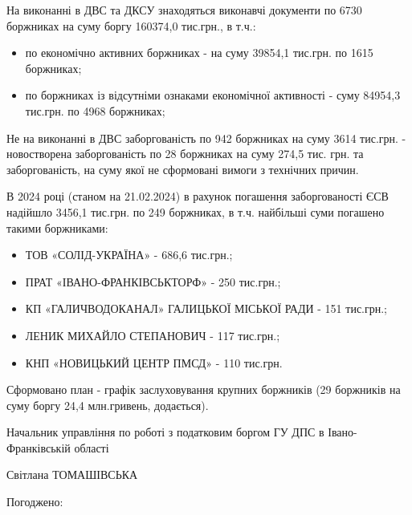  На виконанні в ДВС та ДКСУ знаходяться виконавчі документи по 6730 боржниках на суму боргу 160374,0 тис.грн., в т.ч.:
 \begin{itemize}
     \item по економічно активних боржниках - на суму 39854,1 тис.грн. по 1615 боржниках;
     \item по боржниках із відсутніми ознаками економічної активності - суму 84954,3 тис.грн. по 4968 боржниках;
 \end{itemize}

 Не на виконанні в ДВС заборгованість по 942 боржниках на суму 3614 тис.грн. - новостворена заборгованість по 28 боржниках на суму 274,5 тис. грн. та заборгованість, на суму якої не сформовані вимоги з технічних причин.

 В 2024 році (станом на 21.02.2024) в рахунок погашення заборгованості ЄСВ надійшло 3456,1 тис.грн. по 249 боржниках, в т.ч. найбільші суми погашено такими боржниками:
 \begin{itemize}
     \item ТОВ «СОЛІД-УКРАЇНА» - 686,6 тис.грн.;
     \item ПРАТ «ІВАНО-ФРАНКІВСЬКТОРФ» - 250 тис.грн.;
     \item КП «ГАЛИЧВОДОКАНАЛ» ГАЛИЦЬКОЇ МІСЬКОЇ РАДИ - 151 тис.грн.;
     \item ЛЕНИК МИХАЙЛО СТЕПАНОВИЧ - 117 тис.грн.;
     \item КНП «НОВИЦЬКИЙ ЦЕНТР ПМСД» - 110 тис.грн.
 \end{itemize}

Сформовано план - графік заслуховування крупних боржників (29 боржників на суму боргу 24,4 млн.гривень, додається).

  
	\vspace{10.8pt}
 

	
	
	\vspace{20.8pt}
	\begin{minipage}{0.4\textwidth}
	Начальник управління по роботі з податковим боргом ГУ ДПС в Івано-Франківській області
	\end{minipage}
	\hspace{5ex} \hspace{1ex} \hspace{5ex} {\normalsize Світлана ТОМАШІВСЬКА }
	
	\vspace{15.0pt}	
	\hspace{1ex}Погоджено:
	\vspace{5pt}
		
